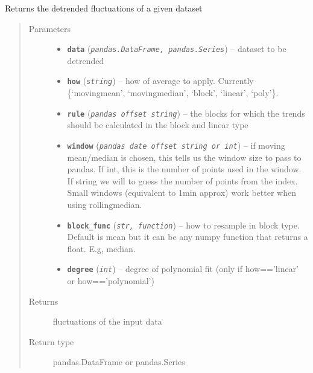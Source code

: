 \documentclass[a4paper,10pt,oneside]{sphinxmanual}
\begin{document}
\begin{fulllineitems}
\label{pymicra:pymicra.data.detrend}
Returns the detrended fluctuations of a given dataset
\begin{quote}\begin{description}
\item[{Parameters}] \leavevmode\begin{itemize}
\item {} 
\textbf{\texttt{data}} (\emph{\texttt{pandas.DataFrame, pandas.Series}}) -- dataset to be detrended

\item {} 
\textbf{\texttt{how}} (\emph{\texttt{string}}) -- how of average to apply. Currently \{`movingmean', `movingmedian', `block', `linear', `poly'\}.

\item {} 
\textbf{\texttt{rule}} (\emph{\texttt{pandas offset string}}) -- the blocks for which the trends should be calculated in the block and linear type

\item {} 
\textbf{\texttt{window}} (\emph{\texttt{pandas date offset string or int}}) -- if moving mean/median is chosen, this tells us the window size to pass to pandas. If int,
this is the number of points used in the window. If string we will to guess the number of
points from the index.
Small windows (equivalent to 1min approx) work better when using rollingmedian.

\item {} 
\textbf{\texttt{block\_func}} (\emph{\texttt{str, function}}) -- how to resample in block type. Default is mean but it can be any numpy function
that returns a float. E.g, median.

\item {} 
\textbf{\texttt{degree}} (\emph{\texttt{int}}) -- degree of polynomial fit (only if how=='linear' or how=='polynomial')

\end{itemize}

\item[{Returns}] \leavevmode
fluctuations of the input data

\item[{Return type}] \leavevmode
pandas.DataFrame or pandas.Series

\end{description}\end{quote}

\end{fulllineitems}
\end{document}

